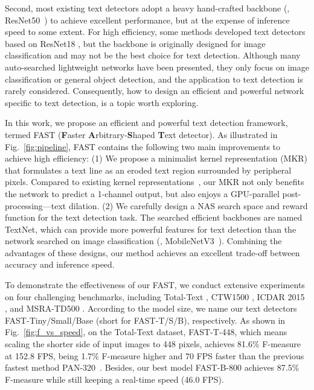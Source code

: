 \documentclass[lettersize,journal]{IEEEtran}
\begin{document}
Second, most existing text detectors adopt a heavy hand-crafted backbone (\eg, ResNet50~\cite{he2016deep}) to achieve excellent performance, but at the expense of inference speed to some extent. 
For high efficiency, some methods \cite{liao2020real,wang2019efficient} developed text detectors based on ResNet18 \cite{he2016deep}, but the backbone is originally designed for image classification and may not be the best choice for text detection.
Although many auto-searched lightweight networks \cite{cai2019once,cai2018proxylessnas,howard2019searching,tan2019efficientnet} have been presented, they only focus on image classification or general object detection, and the application to text detection is rarely considered.
Consequently, how to design an efficient and powerful network specific to text detection, is a topic worth exploring.


In this work, we propose an efficient and powerful text detection framework, termed FAST (\textbf{F}aster \textbf{A}rbitrary-\textbf{S}haped \textbf{T}ext detector).
As illustrated in Fig.~\ref{fig:pipeline}, FAST contains the following two main improvements to achieve high efficiency:
(1) We propose a minimalist kernel representation (MKR) that formulates a text line as an eroded text region surrounded by peripheral pixels.
Compared to existing kernel representations~\cite{liao2020real,wang2019shape,wang2019efficient}, our MKR not only benefits the network to predict a 1-channel output, but also enjoys a GPU-parallel post-processing---text dilation.
(2) We carefully design a NAS search space and reward function for the text detection task.
The searched efficient backbones are named TextNet, which can provide more powerful features for text detection than the network searched on image classification (\eg, MobileNetV3~\cite{howard2019searching}).
Combining the advantages of these designs, our method achieves an excellent trade-off between accuracy and inference speed.



To demonstrate the effectiveness of our FAST, we conduct extensive experiments on four challenging benchmarks, including Total-Text \cite{ch2017total}, CTW1500 \cite{liu2019curved}, ICDAR 2015 \cite{karatzas2015icdar}, and MSRA-TD500 \cite{yao2012detecting}. 
According to the model size, we name our text detectors FAST-Tiny/Small/Base (short for FAST-T/S/B), respectively.
As shown in Fig.~\ref{fig:f_vs_speed}, on the Total-Text dataset,
FAST-T-448, which means scaling the shorter side of input images to 448 pixels, achieves 81.6\% F-measure at 152.8 FPS, being 1.7\% F-measure higher and 70 FPS faster than the previous fastest method PAN-320~\cite{wang2019efficient}. 
Besides, our best model FAST-B-800 achieves 87.5\% F-measure while still keeping a real-time speed (46.0 FPS).
\end{document}

